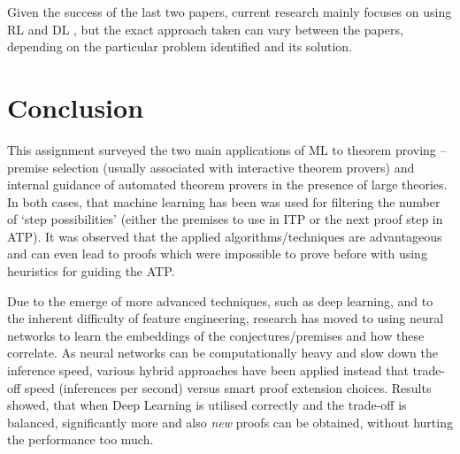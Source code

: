 \documentclass{article}
\begin{document}
Given the success of the last two papers, current research mainly focuses on
using RL and DL \citep{GuidingTPbyRNNs,TowardsLonger}, but the exact
approach taken can vary between the papers, depending on the particular problem
identified and its solution.

\section{Conclusion}\label{sec:conclusion}

This assignment surveyed the two main applications of ML to theorem proving --
premise selection (usually associated with interactive theorem provers) and
internal guidance of automated theorem provers in the presence of large
theories. In both cases, that machine learning has been was used for filtering
the number of `step possibilities' (either the premises to use in ITP or the
next proof step in ATP). It was observed that the applied algorithms/techniques
are advantageous and can even lead to proofs which were impossible to prove
before with using heuristics for guiding the ATP.

Due to the emerge of more advanced techniques, such as deep learning, and to
the inherent difficulty of feature engineering, research has moved to using
neural networks to learn the embeddings of the conjectures/premises and how
these correlate. As neural networks can be computationally heavy and slow down
the inference speed, various hybrid approaches have been applied instead that
trade-off speed (inferences per second) versus smart proof extension choices.
Results showed, that when Deep Learning is utilised correctly and the trade-off
is balanced, significantly more and also \emph{new} proofs can be obtained,
without hurting the performance too much.



\end{document}
